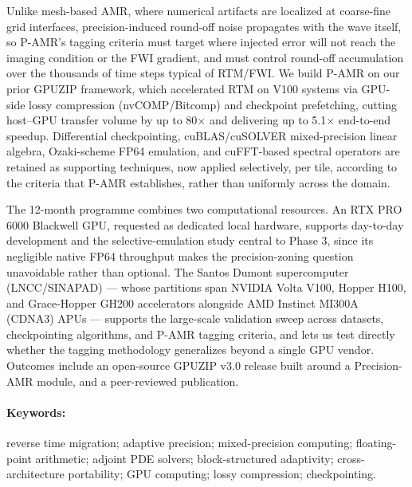 \documentclass[12pt,a4paper]{article}
\newcommand{\pamr}{P\nobreakdash-AMR}
\begin{document}
Unlike mesh-based AMR, where numerical artifacts are localized at coarse-fine
grid interfaces, precision-induced round-off noise propagates with the wave
itself, so \pamr{}'s tagging criteria must target where injected error will not
reach the imaging condition or the FWI gradient, and must control round-off
accumulation over the thousands of time steps typical of RTM/FWI. We build
\pamr{} on our prior GPUZIP framework, which accelerated RTM on V100 systems
via GPU-side lossy compression (nvCOMP/Bitcomp) and checkpoint prefetching,
cutting host--GPU transfer volume by up to 80$\times$ and delivering up to
5.1$\times$ end-to-end speedup. Differential checkpointing, cuBLAS/cuSOLVER
mixed-precision linear algebra, Ozaki-scheme FP64 emulation, and cuFFT-based
spectral operators are retained as supporting techniques, now applied
selectively, per tile, according to the criteria that \pamr{} establishes,
rather than uniformly across the domain.

The 12-month programme combines two computational resources. An RTX PRO 6000
Blackwell GPU, requested as dedicated local hardware, supports day-to-day
development and the selective-emulation study central to Phase 3, since its
negligible native FP64 throughput makes the precision-zoning question
unavoidable rather than optional. The Santos Dumont supercomputer
(LNCC/SINAPAD) --- whose partitions span NVIDIA Volta V100, Hopper H100, and
Grace-Hopper GH200 accelerators alongside AMD Instinct MI300A (CDNA3) APUs ---
supports the large-scale validation sweep across datasets, checkpointing
algorithms, and \pamr{} tagging criteria, and lets us test directly whether the
tagging methodology generalizes beyond a single GPU vendor. Outcomes include an
open-source GPUZIP v3.0 release built around a Precision-AMR module, and a
peer-reviewed publication.

\paragraph{Keywords:} reverse time migration; adaptive precision;
mixed-precision computing; floating-point arithmetic; adjoint PDE solvers;
block-structured adaptivity; cross-architecture portability; GPU computing;
lossy compression; checkpointing.

\fi

\iffalse
\end{document}
